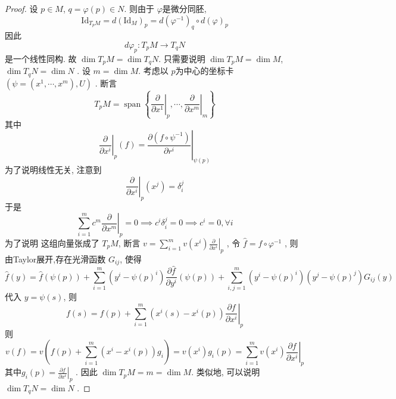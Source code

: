 \documentclass[../main.tex]{subfiles}
\begin{document}
\begin{proof}
    设 \(  p \in M  \), \(  q=  \varphi \left( p \right)\in N   \). 则由于 \(   \varphi   \)是微分同胚, \[
    \mathrm{Id}_{T_{p}M}= d\left( \mathrm{Id}_{M} \right)_{p}= d\left(  \varphi ^{-1}  \right)_{q} \circ d\left(  \varphi  \right)   _{p}
    \]   因此 \[
    d \varphi _{p}: T_{p}M\to T_{q}N
    \]是一个线性同构. 故 \(  \operatorname{dim}T_{p}M  = \operatorname{dim}T_{q}N\).  只需要说明 \(  \operatorname{dim}T_{p}M= \operatorname{dim}M  \), \(  \operatorname{dim}T_{q}N= \operatorname{dim}N  \)   . 设 \(  m= \operatorname{dim}M  \). 考虑以 \(  p  \)为中心的坐标卡 \(  \left( \psi= \left( x^{1},\cdots ,x^{m} \right)  ,U  \right)   \)  . 断言 \[
    T_{p}M= \operatorname{span}\left\{ \left. \frac{\partial }{\partial x^{1}} \right|_{p},\cdots ,\left. \frac{\partial }{\partial x^{m}} \right|_{m} \right\}
    \]其中 \[
    \left. \frac{\partial }{\partial x^{i}} \right|_{p}\left( f \right) =\left.  \frac{\partial \left( f\circ \psi  ^{-1}  \right) }{\partial r^{i}} \right|_{ \psi  \left( p \right) }
    \]为了说明线性无关, 注意到 \[
    \left. \frac{\partial }{\partial x^{i}} \right|_{p}\left( x^{j} \right) =  \delta _{i}^{j}
    \]于是 \[
    \sum _{i= 1}^{m}c^{m}\left. \frac{\partial }{\partial x^{m}} \right|_{p}= 0\implies  c^{i} \delta _{i}^{j}= 0\implies c^{i}= 0,\forall i
    \]为了说明 这组向量张成了 \(  T_{p}M  \), 断言 \(  v= \sum _{i= 1}^{m}v\left( x^{i} \right)\left. \frac{\partial }{\partial x^{i}} \right|_{p}   \) , 令 \(  \hat{f}= f\circ  \varphi ^{-1}   \)  , 则由Taylor展开,存在光滑函数 \(  G_{ij}  \), 使得 \[
    \hat{f}(y) = \hat{f}(\psi (p)) + \sum_{i=1}^m (y^i - \psi (p)^i) \frac{\partial \hat{f}}{\partial y^i}(\psi (p)) + \sum_{i,j=1}^m (y^i - \psi (p)^i)(y^j - \psi (p)^j) G_{ij}(y)
    \]代入 \(  y=  \psi  \left( s\right)   \), 则 \[
    f\left( s \right)= f\left( p \right)+ \sum _{i= 1}^{m}\left( x^{i}\left( s \right)-x^{i}\left( p \right)   \right)\left. \frac{\partial f}{\partial x^{i}} \right|_{p}   
    \] 则 \[
    v\left( f \right)= v\left( f\left( p \right)+ \sum _{i= 1}^{m}\left( x^{i}-x^{i}\left( p \right)  \right)g_{i}  \right)  = v\left( x^{i} \right)g_{i}\left( p \right)= \sum _{i= 1}^{m}v\left( x^{i} \right)\left. \frac{\partial f}{\partial x^{i}} \right|_{p}   
    \]其中\(  g_{i}\left( p \right)= \left. \frac{\partial f}{\partial x^{i}} \right|_{p}   \) . 因此 \(  \operatorname{dim}T_{p}M= m= \operatorname{dim}M  \). 类似地, 可以说明 \(  \operatorname{dim}T_{q}N= \operatorname{dim}N  \)  .
\end{proof}
\end{document}
